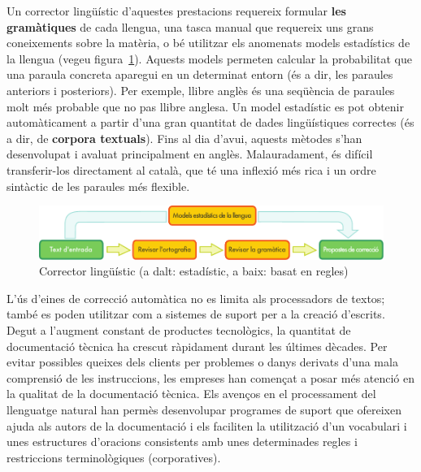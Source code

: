 \begin{multicols}{2}

Un corrector lingüístic d'aquestes prestacions requereix formular \textbf{les gramàtiques} de cada llengua, una tasca manual que requereix uns grans coneixements sobre la matèria, o bé utilitzar els anomenats models estadístics de la llengua (vegeu figura~\ref{fig:langcheckingaarch_ca}). Aquests models permeten calcular la probabilitat que una paraula concreta aparegui en un determinat entorn (és a dir, les paraules anteriors i posteriors). Per exemple, llibre anglès és una seqüència de paraules molt més probable que no pas llibre anglesa. Un model estadístic es pot obtenir automàticament a partir d’una gran quantitat de dades lingüístiques correctes (és a dir, de \textbf{corpora textuals}). Fins al dia d’avui, aquests mètodes s’han desenvolupat i avaluat principalment en anglès. Malauradament, és difícil transferir-los directament al català, que té una inflexió més rica i un ordre sintàctic de les paraules més flexible.

\begin{figure}[htb]
  \center
  \includegraphics[width=\textwidth]{../_media/catalan/language_checking}
  \caption{Corrector lingüístic (a dalt: estadístic, a baix: basat en regles)}
  \label{fig:langcheckingaarch_ca}
\end{figure}

L’ús d’eines de correcció automàtica no es limita als processadors de textos; també es poden utilitzar com a sistemes de suport per a la creació d’escrits. Degut a l’augment constant de productes tecnològics, la quantitat de documentació tècnica ha crescut ràpidament durant les últimes dècades. Per evitar possibles queixes dels clients per problemes o danys derivats d’una mala comprensió de les instruccions, les empreses han començat a posar més atenció en la qualitat de la documentació tècnica. Els avenços en el processament del llenguatge natural han permès desenvolupar programes de suport que ofereixen ajuda als autors de la documentació i els faciliten la utilització d’un vocabulari i unes estructures d’oracions consistents amb unes determinades regles i restriccions terminològiques (corporatives).


\end{multicols}
